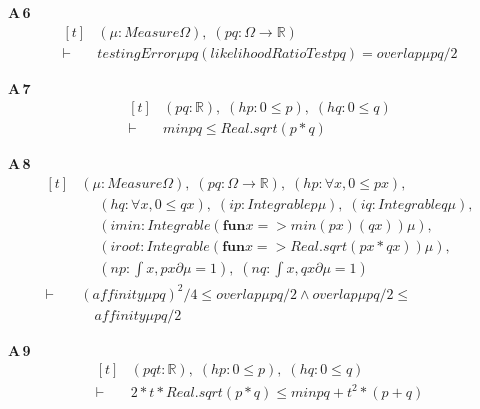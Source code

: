 \noindent\textbf{A\,6}\quad{}
{\footnotesize\[ \begin{aligned}[t]
&(\mu : \mathit{Measure} \Omega ),\; (\mathit{p} \mathit{q} : \Omega \to \mathbb{R} )\\
\vdash\;&\mathit{testingError} \mu \mathit{p} \mathit{q} (\mathit{likelihoodRatioTest} \mathit{p} \mathit{q}) = \mathit{overlap} \mu \mathit{p} \mathit{q}/2
\end{aligned} \]}

\noindent\textbf{A\,7}\quad{}
{\footnotesize\[ \begin{aligned}[t]
&(\mathit{p} \mathit{q} : \mathbb{R} ),\; (\mathit{hp} : 0 \leq \mathit{p}),\; (\mathit{hq} : 0 \leq \mathit{q})\\
\vdash\;&\mathit{min} \mathit{p} \mathit{q} \leq \mathit{Real}.\mathit{sqrt} (\mathit{p}*\mathit{q})
\end{aligned} \]}

\noindent\textbf{A\,8}\quad{}
{\footnotesize\[ \begin{aligned}[t]
&(\mu : \mathit{Measure} \Omega ),\; (\mathit{p} \mathit{q} : \Omega \to \mathbb{R} ),\; (\mathit{hp} : \forall \mathit{x}, 0 \leq \mathit{p} \mathit{x}),\\
&\quad \; (\mathit{hq} : \forall \mathit{x}, 0 \leq \mathit{q} \mathit{x}),\; (\mathit{ip} : \mathit{Integrable} \mathit{p} \mu ),\; (\mathit{iq} : \mathit{Integrable} \mathit{q} \mu ),\\
&\quad \; (\mathit{imin} : \mathit{Integrable} (\mathbf{fun} \mathit{x} => \mathit{min} (\mathit{p} \mathit{x}) (\mathit{q} \mathit{x})) \mu ),\\
&\quad \; (\mathit{iroot} : \mathit{Integrable} (\mathbf{fun} \mathit{x} => \mathit{Real}.\mathit{sqrt} (\mathit{p} \mathit{x}*\mathit{q} \mathit{x})) \mu ),\\
&\quad \; (\mathit{np} : \int \mathit{x}, \mathit{p} \mathit{x} ∂\mu = 1),\; (\mathit{nq} : \int \mathit{x}, \mathit{q} \mathit{x} ∂\mu = 1)\\
\vdash\;&(\mathit{affinity} \mu \mathit{p} \mathit{q})^{2}/4 \leq \mathit{overlap} \mu \mathit{p} \mathit{q}/2 \wedge \mathit{overlap} \mu \mathit{p} \mathit{q}/2 \leq\\
&\quad \mathit{affinity} \mu \mathit{p} \mathit{q}/2
\end{aligned} \]}

\noindent\textbf{A\,9}\quad{}
{\footnotesize\[ \begin{aligned}[t]
&(\mathit{p} \mathit{q} \mathit{t} : \mathbb{R} ),\; (\mathit{hp} : 0 \leq \mathit{p}),\; (\mathit{hq} : 0 \leq \mathit{q})\\
\vdash\;&2*\mathit{t}*\mathit{Real}.\mathit{sqrt} (\mathit{p}*\mathit{q}) \leq \mathit{min} \mathit{p} \mathit{q} + \mathit{t}^{2}*(\mathit{p}+\mathit{q})
\end{aligned} \]}

